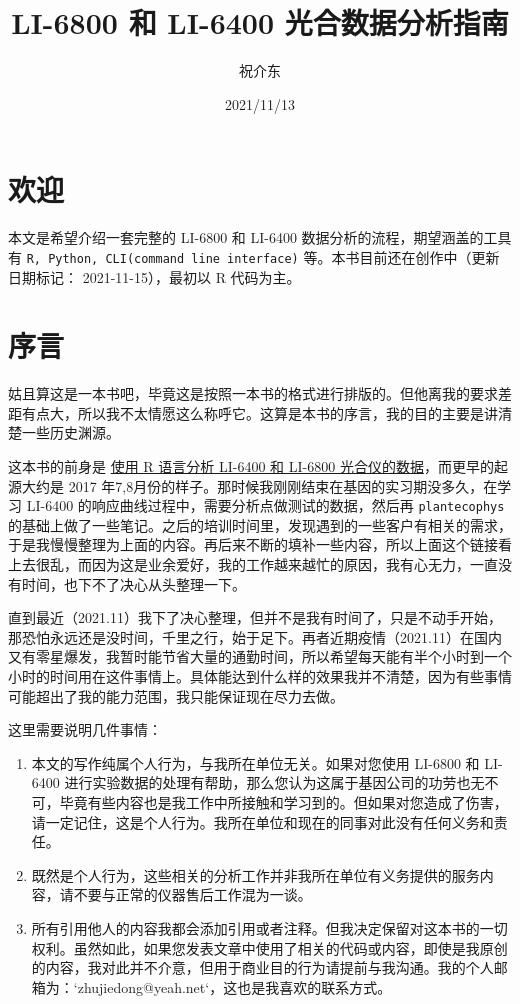 \documentclass[
  letterpaper,
  DIV=11]{scrreport}
\title{LI-6800 和 LI-6400 光合数据分析指南}
\author{祝介东}
\date{2021/11/13}
\begin{document}
\maketitle

\renewcommand*\contentsname{On this page}
{
\hypersetup{linkcolor=}
\setcounter{tocdepth}{2}
\tableofcontents
}
\hypertarget{welcome}{%
\chapter*{欢迎}\label{welcome}}

本文是希望介绍一套完整的 LI-6800 和 LI-6400
数据分析的流程，期望涵盖的工具有
\texttt{R,\ Python,\ CLI(command\ line\ interface)}
等。本书目前还在创作中（更新日期标记： 2021-11-15），最初以 R 代码为主。

\hypertarget{preface}{%
\chapter*{序言}\label{preface}}

姑且算这是一本书吧，毕竟这是按照一本书的格式进行排版的。但他离我的要求差距有点大，所以我不太情愿这么称呼它。这算是本书的序言，我的目的主要是讲清楚一些历史渊源。

这本书的前身是 \href{https://zhujiedong.github.io/photoanalysis/}{使用 R
语言分析 LI-6400 和 LI-6800 光合仪的数据}，而更早的起源大约是 2017
年7,8月份的样子。那时候我刚刚结束在基因的实习期没多久，在学习 LI-6400
的响应曲线过程中，需要分析点做测试的数据，然后再 \texttt{plantecophys}
的基础上做了一些笔记。之后的培训时间里，发现遇到的一些客户有相关的需求，于是我慢慢整理为上面的内容。再后来不断的填补一些内容，所以上面这个链接看上去很乱，而因为这是业余爱好，我的工作越来越忙的原因，我有心无力，一直没有时间，也下不了决心从头整理一下。

直到最近（2021.11）我下了决心整理，但并不是我有时间了，只是不动手开始，那恐怕永远还是没时间，千里之行，始于足下。再者近期疫情（2021.11）在国内又有零星爆发，我暂时能节省大量的通勤时间，所以希望每天能有半个小时到一个小时的时间用在这件事情上。具体能达到什么样的效果我并不清楚，因为有些事情可能超出了我的能力范围，我只能保证现在尽力去做。

这里需要说明几件事情：

\begin{enumerate}
\def\labelenumi{\arabic{enumi}.}
\item
  本文的写作纯属个人行为，与我所在单位无关。如果对您使用 LI-6800 和
  LI-6400
  进行实验数据的处理有帮助，那么您认为这属于基因公司的功劳也无不可，毕竟有些内容也是我工作中所接触和学习到的。但如果对您造成了伤害，请一定记住，这是个人行为。我所在单位和现在的同事对此没有任何义务和责任。
\item
  既然是个人行为，这些相关的分析工作并非我所在单位有义务提供的服务内容，请不要与正常的仪器售后工作混为一谈。
\item
  所有引用他人的内容我都会添加引用或者注释。但我决定保留对这本书的一切权利。虽然如此，如果您发表文章中使用了相关的代码或内容，即使是我原创的内容，我对此并不介意，但用于商业目的行为请提前与我沟通。我的个人邮箱为：`zhujiedong@yeah.net`，这也是我喜欢的联系方式。
\end{enumerate}
\end{document}
